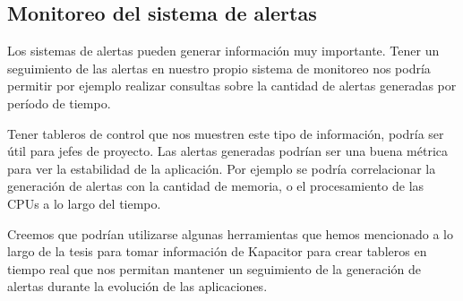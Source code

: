\subsection{Monitoreo del sistema de alertas}
\label{del-sistema-de-alertas}

Los sistemas de alertas pueden generar información muy importante. Tener un seguimiento de las alertas en nuestro propio sistema de monitoreo nos podría permitir por ejemplo realizar consultas sobre la cantidad de alertas generadas por período de tiempo.

Tener tableros de control que nos muestren este tipo de información, podría ser útil para jefes de proyecto. Las alertas generadas podrían ser una buena métrica para ver la estabilidad de la aplicación. Por ejemplo se podría correlacionar la generación de alertas con la cantidad de memoria, o el procesamiento de las CPUs a lo largo del tiempo.

Creemos que podrían utilizarse algunas herramientas que hemos mencionado a lo largo de la tesis para tomar información de Kapacitor para crear tableros en tiempo real que nos permitan mantener un seguimiento de la generación de alertas durante la evolución de las aplicaciones.
